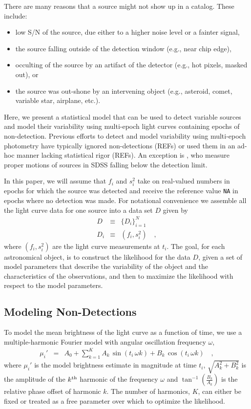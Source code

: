 \documentclass[12pt,preprint]{aastex}
\newcommand{\fobs}{f_i}
\newcommand{\sobs}{s^2_i}
\begin{document}
There are many reasons that a source might not show up in a catalog.  These include:
\begin{itemize}
\item low S/N of the source, due either to a higher noise level or a fainter signal,
\item the source falling outside of the detection window (e.g., near chip edge),
\item occulting of the source by an artifact of the detector (e.g., hot pixels, masked out), or
\item the source was out-shone by an intervening object (e.g., asteroid, comet, variable star, airplane, etc.).
\end{itemize}
Here, we present a statistical model that can be used to detect variable sources and model their variability using multi-epoch light curves containing epochs of non-detection.  Previous efforts to detect and model variability using multi-epoch photometry have typically ignored non-detections (REFs) or used them in an ad-hoc manner lacking statistical rigor (REFs).  An exception is \citet{2009AJ....137.4400L}, who measure proper motions of sources in SDSS falling below the detection limit.


In this paper, we will assume that $\fobs$ and $\sobs$ take on real-valued numbers in epochs for which the source was detected and receive the reference value {\tt NA} in epochs where no detection was made. For notational convenience we assemble all the light curve data for one source into a data set $D$ given by
\begin{eqnarray}\displaystyle
D &\equiv& \{D_i\}_{i=1}^N
\\
D_i &\equiv& (\fobs, \sobs)
\quad ,
\end{eqnarray}
where $(\fobs, \sobs)$ are the light curve measurements  at $t_i$.  The goal, for each astronomical object, is to construct the likelihood for the data $D$, given a set of model parameters that describe the variability of the object and the characteristics of the observations, and then to maximize the likelihood with respect to the model parameters.%

\subsection{Modeling Non-Detections}
To model the mean brightness of the light curve as a function of time, we use a multiple-harmonic Fourier model with angular oscillation frequency $\omega$,
\begin{eqnarray}\displaystyle
\mu_i' &=& A_0 + \sum_{k=1}^K A_k\, \sin (t_i \, \omega  k) + B_k\, \cos (t_i \, \omega  k)
\quad ,\label{eq:fourier}
\end{eqnarray}
where $\mu_i'$ is the model brightness estimate in magnitude at time $t_i$, $\sqrt{A_k^2 + B_k^2}$ is the amplitude of the $k^{\rm th}$ harmonic of the frequency $\omega$ and $\tan^{-1}(\frac{B_k}{A_k})$ is the relative phase offset of harmonic $k$.  The number of harmonics, $K$, can either be fixed or treated as a free parameter over which to optimize the likelihood.
\end{document}

